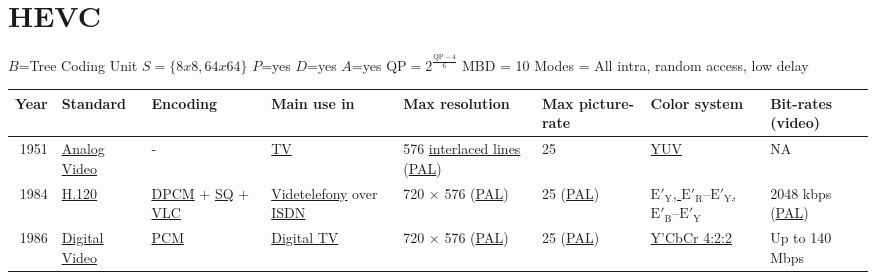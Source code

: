 \section{HEVC}

$B$=Tree Coding Unit
$S=\{8x8, 64x64\}$
$P$=yes
$D$=yes
$A$=yes
$\text{QP}=2^{\frac{\text{QP}-4}{6}}$
MBD = 10
Modes = All intra, random access, low delay

\begin{tabular}{rlllllll}

Year & Standard & Encoding & Main use in & Max resolution & Max picture-rate & Color system & Bit-rates (video)\\
\hline

1951 & %
\href{https://en.wikipedia.org/wiki/Video#Analog_video}{Analog Video} & %
- & %
\href{https://en.wikipedia.org/wiki/Television}{TV} & %
576 \href{https://en.wikipedia.org/wiki/Interlaced_video}{interlaced lines} (\href{https://en.wikipedia.org/wiki/PAL}{PAL}) & %
25 & %
\href{https://en.wikipedia.org/wiki/YUV}{YUV} & %
NA \\ %

1984 & %
\href{https://en.wikipedia.org/wiki/H.120}{H.120} & %
\href{https://en.wikipedia.org/wiki/Differential_pulse-code_modulation}{DPCM} + \href{https://en.wikipedia.org/wiki/Quantization_(signal_processing)}{SQ} + \href{https://en.wikipedia.org/wiki/Variable-length_code}{VLC} & %
\href{https://en.wikipedia.org/wiki/Digital_television}{Videtelefony} over \href{https://en.wikipedia.org/wiki/Digital_television}{ISDN} & %
720 × 576 (\href{https://en.wikipedia.org/wiki/PAL}{PAL}) & %
25 (\href{https://en.wikipedia.org/wiki/PAL}{PAL}) & %
\href{https://en.wikipedia.org/wiki/Chroma_subsampling#4:2:2}{$\text{E}'_\text{Y}$, $\text{E}'_\text{R} – \text{E}'_\text{Y}$, $\text{E}'_\text{B} – \text{E}'_\text{Y}$} & %
2048 kbps (\href{https://en.wikipedia.org/wiki/PAL}{PAL}) \\ %

1986 & %
\href{https://en.wikipedia.org/wiki/Digital_video}{Digital Video} & %
\href{https://en.wikipedia.org/wiki/Pulse-code_modulation}{PCM} & %
\href{https://en.wikipedia.org/wiki/Digital_television}{Digital TV} & %
720 × 576 (\href{https://en.wikipedia.org/wiki/PAL}{PAL}) & %
25 (\href{https://en.wikipedia.org/wiki/PAL}{PAL}) & %
\href{https://en.wikipedia.org/wiki/Chroma_subsampling#4:2:2}{Y'CbCr 4:2:2} & %
Up to 140 Mbps\\


\end{tabular}
